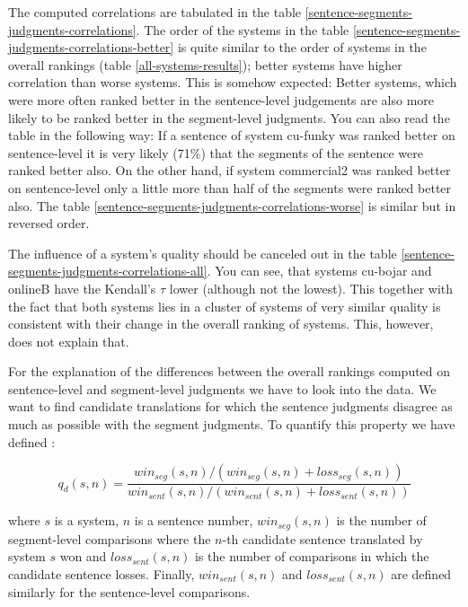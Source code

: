 The computed correlations are tabulated in the table
\ref{sentence-segments-judgments-correlations}. The order of the systems in the
table \ref{sentence-segments-judgments-correlations-better} is quite similar to
the order of systems in the overall rankings (table \ref{all-systems-results});
better systems have higher correlation than worse systems.  This is somehow
expected: Better systems, which were more often ranked better in the
sentence-level judgements are also more likely to be ranked better in the
segment-level judgments.  You can also read the table in the following way: If
a sentence of system cu-funky was ranked better on sentence-level it is very
likely (71\%) that the segments of the sentence were ranked better also. On the
other hand, if system commercial2 was ranked better on sentence-level only a
little more than half of the segments were ranked better also. The table
\ref{sentence-segments-judgments-correlations-worse} is similar but in reversed
order.

The influence of a system's quality should be canceled out in the table
\ref{sentence-segments-judgments-correlations-all}. You can see, that systems
cu-bojar and onlineB have the Kendall's $\tau$ lower (although not the lowest).
This together with the fact that both systems lies in a cluster of systems of
very similar quality is consistent with their change in the overall ranking of
systems. This, however, does not explain that.

For the explanation of the differences between the overall rankings computed on
sentence-level and segment-level judgments we have to look into the data. We
want to find candidate translations for which the sentence judgments disagree as
much as possible with the segment judgments. To quantify this property we have
defined :

\begin{equation*}
  q_d(s,n) = \frac{
    win_{seg}(s,n) / (win_{seg}(s,n) + loss_{seg}(s,n))
  }{
    win_{sent}(s,n)/(win_{sent}(s,n) + loss_{sent}(s,n))
  }
\end{equation*}

\noindent where $s$ is a system, $n$ is a sentence number, $win_{seg}(s,n)$ is
the number of segment-level comparisons where the $n$-th candidate sentence
translated by system $s$ won and $loss_{sent}(s,n)$ is the number of
comparisons in which the candidate sentence losses. Finally, $win_{sent}(s,n)$
and $loss_{sent}(s,n)$ are defined similarly for the sentence-level
comparisons.

